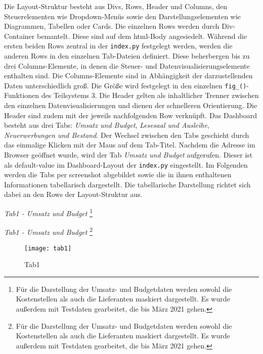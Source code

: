     Die Layout-Struktur besteht aus Divs, Rows, Header und Columns, den Steuerelementen wie Dropdown-Menüs sowie den Darstellungselementen wie Diagrammen, Tabellen
    oder Cards. Die einzelnen Rows werden durch Div-Container bemantelt. Diese sind auf dem html-Body angesiedelt.
    Während die ersten beiden Rows zentral in der \texttt{index.py} festgelegt werden, werden die anderen Rows in den einzelnen Tab-Dateien definiert. 
    Diese beherbergen bis zu drei Columns-Elemente, in denen die Steuer- und Datenvisualisierungselemente enthalten sind.
    Die Columns-Elemente sind in Abhängigkeit der darzustellenden Daten unterschiedlich groß. 
    Die Größe wird festgelegt in den einzelnen \texttt{fig\_()}-Funktionen des Teilsystems 3.
    Die Header gelten als inhaltlicher Trenner zwischen den einzelnen Datenvisualisierungen und dienen der schnelleren Orientierung. 
    Die Header sind zudem mit der jeweils nachfolgenden Row verknüpft. Das Dashboard besteht aus drei Tabs: \textit{Umsatz und Budget}, 
    \textit{Lesesaal und Ausleihe}, \textit{Neuerwerbungen und Bestand}. Der Wechsel zwischen den Tabs geschieht durch das einmalige
    Klicken mit der Maus auf dem Tab-Titel. Nachdem die Adresse im Browser geöffnet wurde, wird der Tab \textit{Umsatz und Budget} aufgerufen. Dieser ist
    als default-value im Dashboard-Layout der \texttt{index.py} eingestellt. Im Folgenden werden die Tabs per screenshot abgebildet sowie 
    die in ihnen enthaltenen Informationen tabellarisch dargestellt. Die tabellarische Darstellung richtet sich dabei an den Rows der Layout-Struktur aus. 

    \noindent
    \textit{Tab1 - Umsatz und Budget}
    \footnote{Für die Darstellung der Umsatz- und
    Budgetdaten werden sowohl die Kostenstellen als auch die Lieferanten maskiert dargestellt. Es wurde außerdem mit Testdaten
    gearbeitet, die bis März 2021 gehen.}

    \recalctypearea
    
    \textit{Tab1 - Umsatz und Budget}
    \footnote{Für die Darstellung der Umsatz- und
    Budgetdaten werden sowohl die Kostenstellen als auch die Lieferanten maskiert dargestellt. Es wurde außerdem mit Testdaten
    gearbeitet, die bis März 2021 gehen.}
    \begin{figure}[H]
        \centering
            \texttt{[image: tab1]}
            \caption{Tab1}
            \label{fig:tab1}
    \end{figure}

